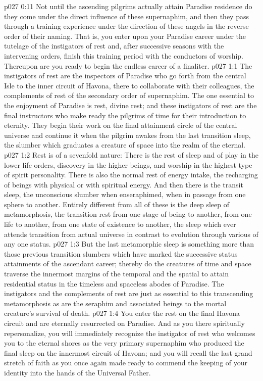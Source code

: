 \vs p027 0:11 Not until the ascending pilgrims actually attain Paradise residence do they come under the direct influence of these supernaphim, and then they pass through a training experience under the direction of these angels in the reverse order of their naming. That is, you enter upon your Paradise career under the tutelage of the instigators of rest and, after successive seasons with the intervening orders, finish this training period with the conductors of worship. Thereupon are you ready to begin the endless career of a finaliter.
\vs p027 1:1 The instigators of rest are the inspectors of Paradise who go forth from the central Isle to the inner circuit of Havona, there to collaborate with their colleagues, the complements of rest of the secondary order of supernaphim. The one essential to the enjoyment of Paradise is rest, divine rest; and these instigators of rest are the final instructors who make ready the pilgrims of time for their introduction to eternity. They begin their work on the final attainment circle of the central universe and continue it when the pilgrim awakes from the last transition sleep, the slumber which graduates a creature of space into the realm of the eternal.
\vs p027 1:2 \pc Rest is of a sevenfold nature: There is the rest of sleep and of play in the lower life orders, discovery in the higher beings, and worship in the highest type of spirit personality. There is also the normal rest of energy intake, the recharging of beings with physical or with spiritual energy. And then there is the transit sleep, the unconscious slumber when enseraphimed, when in passage from one sphere to another. Entirely different from all of these is the deep sleep of metamorphosis, the transition rest from one stage of being to another, from one life to another, from one state of existence to another, the sleep which ever attends transition from actual universe  in contrast to evolution through various  of any one status.
\vs p027 1:3 But the last metamorphic sleep is something more than those previous transition slumbers which have marked the successive status attainments of the ascendant career; thereby do the creatures of time and space traverse the innermost margins of the temporal and the spatial to attain residential status in the timeless and spaceless abodes of Paradise. The instigators and the complements of rest are just as essential to this transcending metamorphosis as are the seraphim and associated beings to the mortal creature’s survival of death.
\vs p027 1:4 \pc You enter the rest on the final Havona circuit and are eternally resurrected on Paradise. And as you there spiritually repersonalize, you will immediately recognize the instigator of rest who welcomes you to the eternal shores as the very primary supernaphim who produced the final sleep on the innermost circuit of Havona; and you will recall the last grand stretch of faith as you once again made ready to commend the keeping of your identity into the hands of the Universal Father.
